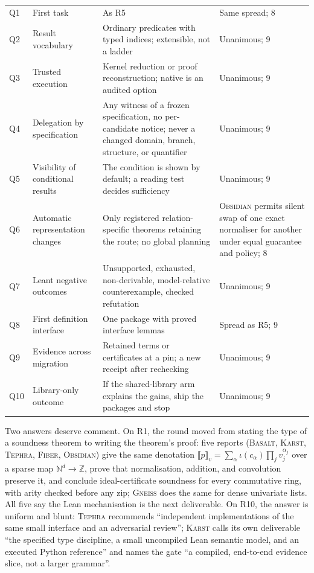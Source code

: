 \documentclass[11pt,a4paper]{article}
\newcommand{\Bs}{\textsc{Basalt}}
\newcommand{\Fb}{\textsc{Fiber}}
\newcommand{\Gn}{\textsc{Gneiss}}
\newcommand{\Ks}{\textsc{Karst}}
\newcommand{\Ob}{\textsc{Obsidian}}
\newcommand{\Tp}{\textsc{Tephra}}
\newcommand{\N}{\mathbb N}
\newcommand{\Z}{\mathbb Z}
\theoremstyle{definition}
\begin{document}
{\begin{longtable}{@{}L{8mm}L{36mm}L{58mm}L{45mm}@{}}
Q1 & First task & As R5 & Same spread; 8\\
Q2 & Result vocabulary & Ordinary predicates with typed indices; extensible, not a ladder & Unanimous; 9\\
Q3 & Trusted execution & Kernel reduction or proof reconstruction; native is an audited option & Unanimous; 9\\
Q4 & Delegation by specification & Any witness of a frozen specification, no per-candidate notice; never a changed domain, branch, structure, or quantifier & Unanimous; 9\\
Q5 & Visibility of conditional results & The condition is shown by default; a reading test decides sufficiency & Unanimous; 9\\
Q6 & Automatic representation changes & Only registered relation-specific theorems retaining the route; no global planning & \Ob{} permits silent swap of one exact normaliser for another under equal guarantee and policy; 8\\
Q7 & Leant negative outcomes & Unsupported, exhausted, non-derivable, model-relative counterexample, checked refutation & Unanimous; 9\\
Q8 & First definition interface & One package with proved interface lemmas & Spread as R5; 9\\
Q9 & Evidence across migration & Retained terms or certificates at a pin; a new receipt after rechecking & Unanimous; 9\\
Q10 & Library-only outcome & If the shared-library arm explains the gains, ship the packages and stop & Unanimous; 9\\
\end{longtable}}

Two answers deserve comment. On R1, the round moved from stating the type of a soundness theorem to writing the theorem's proof: five reports (\Bs, \Ks, \Tp, \Fb, \Ob) give the same denotation $\llbracket p\rrbracket_v=\sum_\alpha\iota(c_\alpha)\prod_j v_j^{\alpha_j}$ over a sparse map $\N^d\to\Z$, prove that normalisation, addition, and convolution preserve it, and conclude ideal-certificate soundness for every commutative ring, with arity checked before any zip; \Gn{} does the same for dense univariate lists. All five say the Lean mechanisation is the next deliverable. On R10, the answer is uniform and blunt: \Tp{} recommends ``independent implementations of the same small interface and an adversarial review''; \Ks{} calls its own deliverable ``the specified type discipline, a small uncompiled Lean semantic model, and an executed Python reference'' and names the gate ``a compiled, end-to-end evidence slice, not a larger grammar''.
\end{document}
